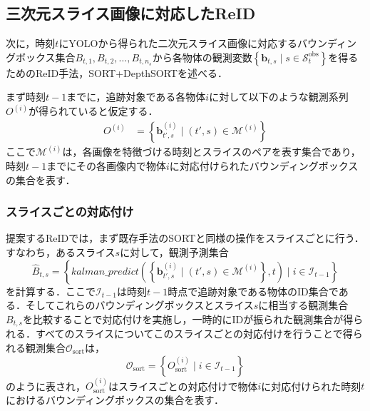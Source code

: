     \subsection{三次元スライス画像に対応したReID}
    \label{subsec:re-identificataion_for_slice}

    次に，時刻$t$にYOLOから得られた二次元スライス画像に対応するバウンディングボックス集合$B_{t, 1}, B_{t, 2}, \dots, B_{t, n_s}$から各物体の観測変数$\left\{\bm{b}_{t, s} \mid s \in \mathcal{S}_t^{\text{obs}}\right\}$を得るためのReID手法，SORT+DepthSORTを述べる．

    まず時刻$t-1$までに，追跡対象である各物体$i$に対して以下のような観測系列$O^{(i)}$が得られていると仮定する．
    \begin{equation}
        \label{eq:tracks_on_reid}
        \begin{aligned}
            O^{(i)} &= \left\{\bm{b}_{t',s}^{(i)} \mid (t', s) \in \mathcal{M}^{(i)}\right\}
        \end{aligned}
    \end{equation}
    ここで$\mathcal{M}^{(i)}$は，各画像を特徴づける時刻とスライスのペアを表す集合であり，時刻$t-1$までにその各画像内で物体$i$に対応付けられたバウンディングボックスの集合を表す．

        \subsubsection{スライスごとの対応付け}

        提案するReIDでは，まず既存手法のSORTと同様の操作をスライスごとに行う．すなわち，あるスライス$s$に対して，観測予測集合
        \begin{equation}
            \label{eq:slice_wise_prediction}
            \hat{B}_{t, s} = \left\{kalman\_predict\left(\left\{\bm{b}_{t', s}^{(i)} \mid (t', s) \in \mathcal{M}^{(i)}\right\}, t\right) \mid i \in \mathcal{I}_{t-1}\right\}
        \end{equation}
        を計算する．ここで$\mathcal{I}_{t-1}$は時刻$t-1$時点で追跡対象である物体のID集合である．そしてこれらのバウンディングボックスとスライス$s$に相当する観測集合$B_{t,s}$を比較することで対応付けを実施し，一時的にIDが振られた観測集合が得られる．すべてのスライスについてこのスライスごとの対応付けを行うことで得られる観測集合$\mathcal{O}_{\text{sort}}$は，
        \begin{equation}
            \label{eq:sort_identified_bboxes}
            \mathcal{O}_{\text{sort}} = \left\{O_{\text{sort}}^{(i)} \mid i \in \mathcal{I}_{t-1}\right\}
        \end{equation}
        のように表され，$O_{\text{sort}}^{(i)}$はスライスごとの対応付けで物体$i$に対応付けられた時刻$t$におけるバウンディングボックスの集合を表す．
        

